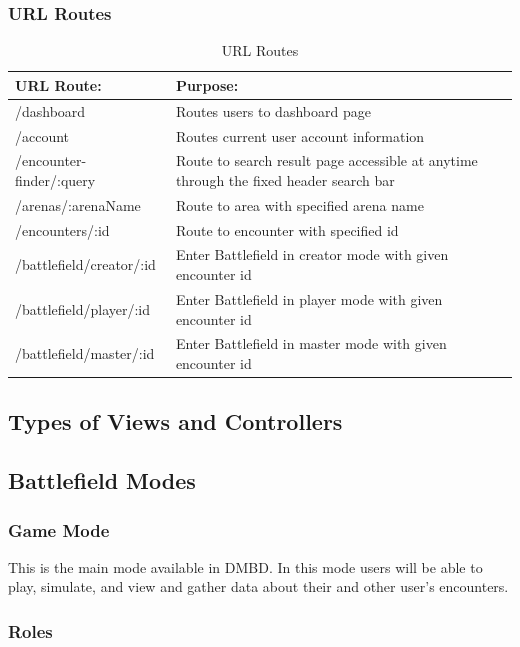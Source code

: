 \documentclass[12pt,a4paper]{report}
\begin{document}
		\subsubsection { URL Routes}
		
			\begin{table}[H]
				\begin{center}
					\begin{tabular}{ |p{5cm}|p{7cm}|| } 
						\hline
						URL Route: & Purpose: \\
						\hline
						/dashboard & Routes users to dashboard page \\
						/account & Routes current user account information\\
						/encounter-finder/:query & Route to search result page accessible at anytime through the fixed header search bar  \\
						/arenas/:arenaName & Route to area with specified arena name  \\
						/encounters/:id & Route to encounter with specified id \\
						/battlefield/creator/:id & Enter Battlefield in creator mode with given encounter id \\
						/battlefield/player/:id & Enter Battlefield in player mode with given encounter id \\
						/battlefield/master/:id & Enter Battlefield in master mode with given encounter id \\	
						\hline
					\end{tabular}
				\end{center}
			\caption{URL Routes} \label{table: URL Routes}
		\end{table}
		
		
	\subsection{Types of Views and Controllers}
	\subsection{Battlefield Modes}
		\subsubsection{Game Mode}
			This is the main mode available in DMBD. In this mode users will be able to play, simulate, and view and gather data about their and other user's encounters.
			\subsubsection{Roles}
\end{document}

